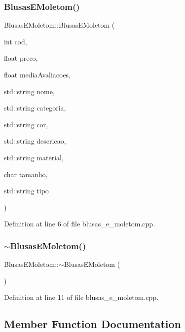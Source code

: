\subsubsection{\texorpdfstring{Blusas\+E\+Moletom()}{BlusasEMoletom()}}
{\footnotesize\ttfamily Blusas\+E\+Moletom\+::\+Blusas\+E\+Moletom (\begin{DoxyParamCaption}\item[{int}]{cod,  }\item[{float}]{preco,  }\item[{float}]{media\+Avaliacoes,  }\item[{std\+::string}]{nome,  }\item[{std\+::string}]{categoria,  }\item[{std\+::string}]{cor,  }\item[{std\+::string}]{descricao,  }\item[{std\+::string}]{material,  }\item[{char}]{tamanho,  }\item[{std\+::string}]{tipo }\end{DoxyParamCaption})}



Definition at line 6 of file blusas\+\_\+e\+\_\+moletom.\+cpp.

\mbox{\label{class_blusas_e_moletom_afcf9fd23819dba9be2e0646fa38905ff}} 
\subsubsection{\texorpdfstring{$\sim$\+Blusas\+E\+Moletom()}{~BlusasEMoletom()}}
{\footnotesize\ttfamily Blusas\+E\+Moletom\+::$\sim$\+Blusas\+E\+Moletom (\begin{DoxyParamCaption}{ }\end{DoxyParamCaption})}



Definition at line 11 of file blusas\+\_\+e\+\_\+moletom.\+cpp.



\subsection{Member Function Documentation}
\mbox{\label{class_blusas_e_moletom_a6856973d4591330c7706f34661b0cfc4}} 
